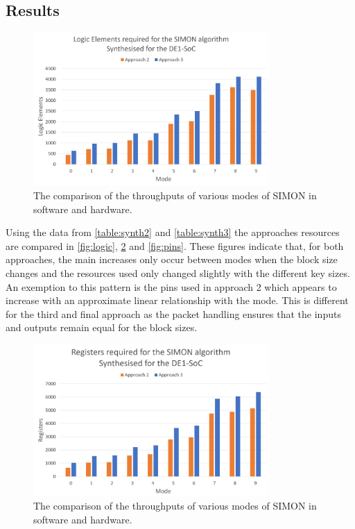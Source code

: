 \documentclass[12pt,twoside,a4paper]{report}
\begin{document}
	\subsection{Results}
	
	\begin{figure}[H]
		\includegraphics[width=0.8\textwidth]{SIMON_logic}
		\centering
		\caption{The comparison of the throughputs of various modes of SIMON in software and hardware.}
		\label{fig:logic}
	\end{figure}
	
	Using the data from \autoref{table:synth2} and \autoref{table:synth3} the approaches resources are compared in \autoref{fig:logic}, \ref{fig:registers} and \ref{fig:pins}.  These figures indicate that, for both approaches, the main increases only occur between modes when the block size changes and the resources used only changed slightly with the different key sizes. An exemption to this pattern is the pins used in approach 2 which appears to increase with an approximate linear relationship with the mode. This is different for the third and final approach as the packet handling ensures that the inputs and outputs remain equal for the block sizes.
	
	\begin{figure}[H]
		\includegraphics[width=0.8\textwidth]{SIMON_registers}
		\centering
		\caption{The comparison of the throughputs of various modes of SIMON in software and hardware.}
		\label{fig:registers}
	\end{figure}
	
\end{document}
